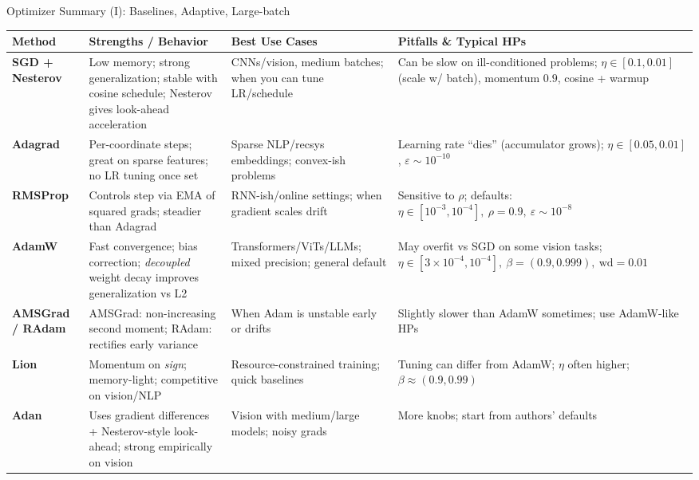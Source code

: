 \documentclass{beamer}
\begin{document}
\begin{frame}{Optimizer Summary (I): Baselines, Adaptive, Large-batch}
\scriptsize
\setlength{\tabcolsep}{3pt}
\renewcommand{\arraystretch}{1.25}
\begin{tabular}{p{2.8cm} p{4.3cm} p{4.5cm} p{3.5cm}}
\textbf{Method} & \textbf{Strengths / Behavior} & \textbf{Best Use Cases} & \textbf{Pitfalls \& Typical HPs} \\
\hline
\textbf{SGD + Nesterov} &
Low memory; strong generalization; stable with cosine schedule; Nesterov gives look-ahead acceleration &
CNNs/vision, medium batches; when you can tune LR/schedule & 
Can be slow on ill-conditioned problems; $\eta\!\in[0.1,0.01]$ (scale w/ batch), momentum $0.9$, cosine + warmup \\

\textbf{Adagrad} &
Per-coordinate steps; great on sparse features; no LR tuning once set &
Sparse NLP/recsys embeddings; convex-ish problems &
Learning rate “dies” (accumulator grows); $\eta\!\in[0.05,0.01]$, $\varepsilon\!\sim\!10^{-10}$ \\

\textbf{RMSProp} &
Controls step via EMA of squared grads; steadier than Adagrad &
RNN-ish/online settings; when gradient scales drift &
Sensitive to $\rho$; defaults: $\eta\!\in[10^{-3},10^{-4}],\ \rho\!=\!0.9,\ \varepsilon\!\sim\!10^{-8}$ \\

\textbf{AdamW} &
Fast convergence; bias correction; \emph{decoupled} weight decay improves generalization vs L2 &
Transformers/ViTs/LLMs; mixed precision; general default &
May overfit vs SGD on some vision tasks; $\eta\!\in[3\!\times\!10^{-4},10^{-4}],\ \beta=(0.9,0.999),\ \text{wd}\!=\!0.01$ \\

\textbf{AMSGrad / RAdam} &
AMSGrad: non-increasing second moment; RAdam: rectifies early variance &
When Adam is unstable early or drifts &
Slightly slower than AdamW sometimes; use AdamW-like HPs \\

\textbf{Lion} &
Momentum on \emph{sign}; memory-light; competitive on vision/NLP &
Resource-constrained training; quick baselines &
Tuning can differ from AdamW; $\eta$ often higher; $\beta\!\approx\!(0.9,0.99)$ \\

\textbf{Adan} &
Uses gradient differences + Nesterov-style look-ahead; strong empirically on vision &
Vision with medium/large models; noisy grads &
More knobs; start from authors’ defaults \\


\end{tabular}
\end{frame}
\end{document}

